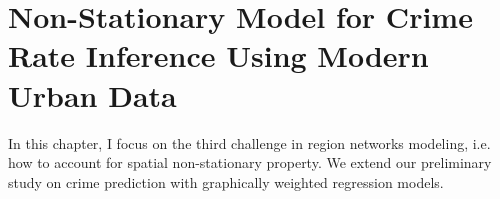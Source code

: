 \chapter{Non-Stationary Model for Crime Rate Inference Using Modern Urban Data}
\label{ch:non-stationary}

In this chapter, I focus on the third challenge in region networks modeling, i.e. how to account for spatial non-stationary property. We extend our preliminary study on crime prediction with graphically weighted regression models.









